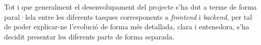 Tot i que generalment el desenvolupament del projecte s'ha dut a terme de forma paral·lela entre les diferents tasques corresponents a \textit{frontend} i \textit{backend}, per tal de poder explicar-ne l'evolució de forma més detallada, clara i entenedora, s'ha decidit presentar les diferents parts de forma separada.


\clearpage

\clearpage